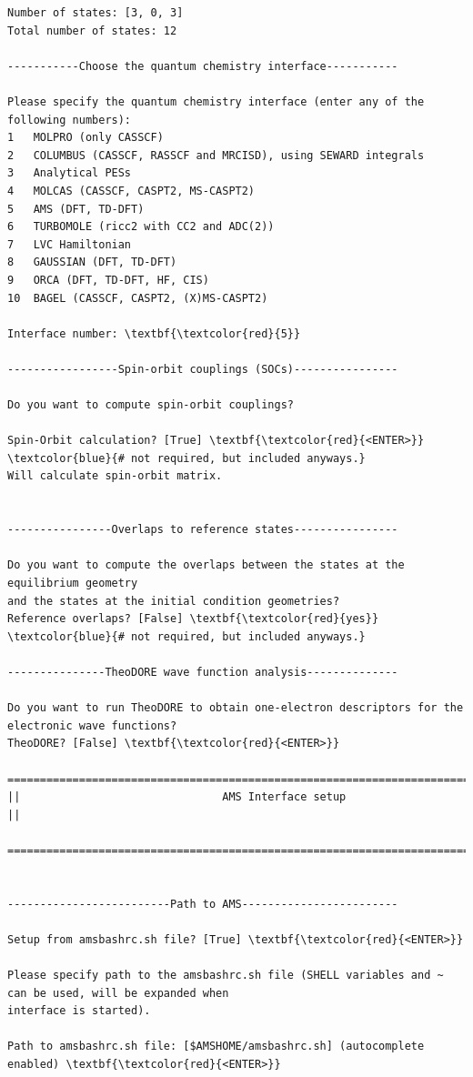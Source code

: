 \documentclass[a4paper,11pt,DIV=15,openany]{scrbook}
\begin{document}
\begin{oframed}
\begin{Verbatim}[commandchars=\\\{\}]
Number of states: [3, 0, 3]
Total number of states: 12

-----------Choose the quantum chemistry interface-----------

Please specify the quantum chemistry interface (enter any of the following numbers):
1	MOLPRO (only CASSCF)
2	COLUMBUS (CASSCF, RASSCF and MRCISD), using SEWARD integrals
3	Analytical PESs
4	MOLCAS (CASSCF, CASPT2, MS-CASPT2)
5	AMS (DFT, TD-DFT)
6	TURBOMOLE (ricc2 with CC2 and ADC(2))
7	LVC Hamiltonian
8	GAUSSIAN (DFT, TD-DFT)
9	ORCA (DFT, TD-DFT, HF, CIS)
10	BAGEL (CASSCF, CASPT2, (X)MS-CASPT2)

Interface number: \textbf{\textcolor{red}{5}}

-----------------Spin-orbit couplings (SOCs)----------------

Do you want to compute spin-orbit couplings?

Spin-Orbit calculation? [True] \textbf{\textcolor{red}{<ENTER>}}     \textcolor{blue}{# not required, but included anyways.}
Will calculate spin-orbit matrix.


----------------Overlaps to reference states----------------

Do you want to compute the overlaps between the states at the equilibrium geometry 
and the states at the initial condition geometries?
Reference overlaps? [False] \textbf{\textcolor{red}{yes}}    \textcolor{blue}{# not required, but included anyways.}

---------------TheoDORE wave function analysis--------------

Do you want to run TheoDORE to obtain one-electron descriptors for the electronic wave functions?
TheoDORE? [False] \textbf{\textcolor{red}{<ENTER>}} 

================================================================================
||                               AMS Interface setup                              ||
  ================================================================================


-------------------------Path to AMS------------------------

Setup from amsbashrc.sh file? [True] \textbf{\textcolor{red}{<ENTER>}}

Please specify path to the amsbashrc.sh file (SHELL variables and ~ can be used, will be expanded when 
interface is started).

Path to amsbashrc.sh file: [$AMSHOME/amsbashrc.sh] (autocomplete enabled) \textbf{\textcolor{red}{<ENTER>}} 


\end{Verbatim}
\end{oframed}
\end{document}
